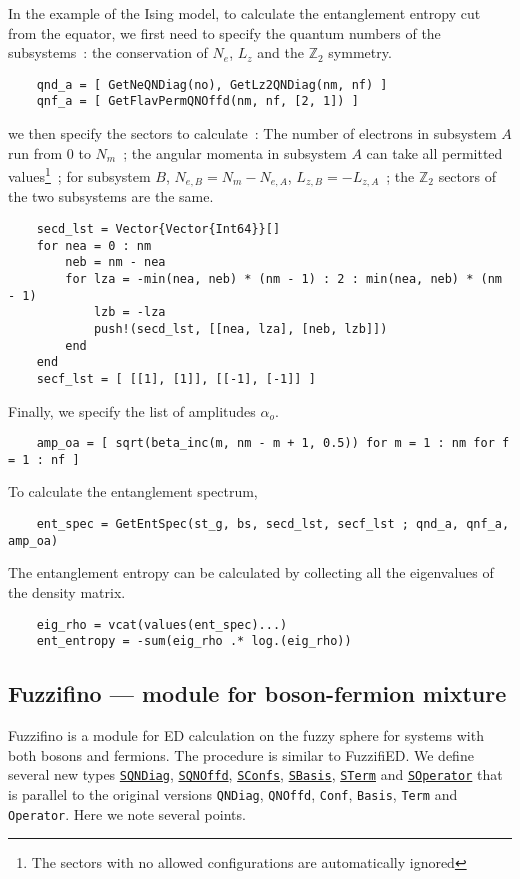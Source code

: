\documentclass{timesjhep}
\begin{document}
In the example of the Ising model, to calculate the entanglement entropy cut from the equator, we first need to specify the quantum numbers of the subsystems~: the conservation of $N_e$, $L_z$ and the $\mathbb{Z}_2$ symmetry.
\begin{lstlisting}
    qnd_a = [ GetNeQNDiag(no), GetLz2QNDiag(nm, nf) ]
    qnf_a = [ GetFlavPermQNOffd(nm, nf, [2, 1]) ]
\end{lstlisting}
we then specify the sectors to calculate~: The number of electrons in subsystem $A$ run from $0$ to $N_m$~; the angular momenta in subsystem $A$ can take all permitted values\footnote{The sectors with no allowed configurations are automatically ignored}~; for subsystem $B$, $N_{e,B}=N_m-N_{e,A}$, $L_{z,B}=-L_{z,A}$~; the $\mathbb{Z}_2$ sectors of the two subsystems are the same.
\begin{lstlisting}
    secd_lst = Vector{Vector{Int64}}[]
    for nea = 0 : nm
        neb = nm - nea
        for lza = -min(nea, neb) * (nm - 1) : 2 : min(nea, neb) * (nm - 1)
            lzb = -lza
            push!(secd_lst, [[nea, lza], [neb, lzb]])
        end
    end
    secf_lst = [ [[1], [1]], [[-1], [-1]] ]
\end{lstlisting}
Finally, we specify the list of amplitudes $\alpha_o$.
\begin{lstlisting}
    amp_oa = [ sqrt(beta_inc(m, nm - m + 1, 0.5)) for m = 1 : nm for f = 1 : nf ]
\end{lstlisting}
To calculate the entanglement spectrum,
\begin{lstlisting}
    ent_spec = GetEntSpec(st_g, bs, secd_lst, secf_lst ; qnd_a, qnf_a, amp_oa)
\end{lstlisting}
The entanglement entropy can be calculated by collecting all the eigenvalues of the density matrix.
\begin{lstlisting}
    eig_rho = vcat(values(ent_spec)...)
    ent_entropy = -sum(eig_rho .* log.(eig_rho))
\end{lstlisting}

\subsection{Fuzzifino --- module for boson-fermion mixture}
\label{sec:ed_fuzzifino}

Fuzzifino is a module for ED calculation on the fuzzy sphere for systems with both bosons and fermions. The procedure is similar to FuzzifiED. We define several new types \href{https://docs.fuzzified.world/fuzzifino/\#FuzzifiED.Fuzzifino.SQNDiag}{\lstinline|SQNDiag|}, \href{https://docs.fuzzified.world/fuzzifino/\#FuzzifiED.Fuzzifino.SQNOffd}{\lstinline|SQNOffd|}, \href{https://docs.fuzzified.world/fuzzifino/\#FuzzifiED.Fuzzifino.SConfs}{\lstinline|SConfs|}, \href{https://docs.fuzzified.world/fuzzifino/\#FuzzifiED.Fuzzifino.SBasis}{\lstinline|SBasis|}, \href{https://docs.fuzzified.world/fuzzifino/\#FuzzifiED.Fuzzifino.STerm}{\lstinline|STerm|} and \href{https://docs.fuzzified.world/fuzzifino/\#FuzzifiED.Fuzzifino.SOperator}{\lstinline|SOperator|} that is parallel to the original versions \lstinline|QNDiag|, \lstinline|QNOffd|, \lstinline|Conf|, \lstinline|Basis|, \lstinline|Term| and \lstinline|Operator|. Here we note several points.
\end{document}
